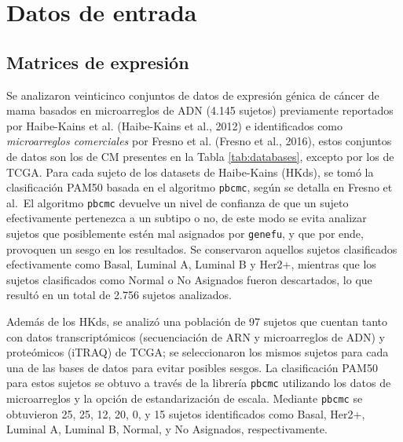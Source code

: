 \documentclass[12pt,twoside]{reedthesis}
\begin{document}
\hypertarget{datos-de-entrada-1}{%
\section{Datos de entrada}\label{datos-de-entrada-1}}

\hypertarget{matrices-de-expresiuxf3n-1}{%
\subsection{Matrices de expresión}\label{matrices-de-expresiuxf3n-1}}

\par

Se analizaron veinticinco conjuntos de datos de expresión génica de cáncer de mama basados en microarreglos de ADN (4.145 sujetos) previamente reportados por Haibe-Kains et al. (Haibe-Kains et al., 2012) e identificados como \emph{microarreglos comerciales} por Fresno et al. (Fresno et al., 2016), estos conjuntos de datos son los de CM presentes en la Tabla \ref{tab:databases}, excepto por los de TCGA. Para cada sujeto de los datasets de Haibe-Kains (HKds), se tomó la clasificación PAM50 basada en el algoritmo \texttt{pbcmc}, según se detalla en Fresno et al.~El algoritmo \texttt{pbcmc} devuelve un nivel de confianza de que un sujeto efectivamente pertenezca a un subtipo o no, de este modo se evita analizar sujetos que posiblemente estén mal asignados por \texttt{genefu}, y que por ende, provoquen un sesgo en los resultados. Se conservaron aquellos sujetos clasificados efectivamente como Basal, Luminal A, Luminal B y Her2+, mientras que los sujetos clasificados como Normal o No Asignados fueron descartados, lo que resultó en un total de 2.756 sujetos analizados.

\par

Además de los HKds, se analizó una población de 97 sujetos que cuentan tanto con datos transcriptómicos (secuenciación de ARN y microarreglos de ADN) y proteómicos (iTRAQ) de TCGA; se seleccionaron los mismos sujetos para cada una de las bases de datos para evitar posibles sesgos. La clasificación PAM50 para estos sujetos se obtuvo a través de la librería \texttt{pbcmc} utilizando los datos de microarreglos y la opción de estandarización de escala. Mediante \texttt{pbcmc} se obtuvieron 25, 25, 12, 20, 0, y 15 sujetos identificados como Basal, Her2+, Luminal A, Luminal B, Normal, y No Asignados, respectivamente.

\par
\end{document}
